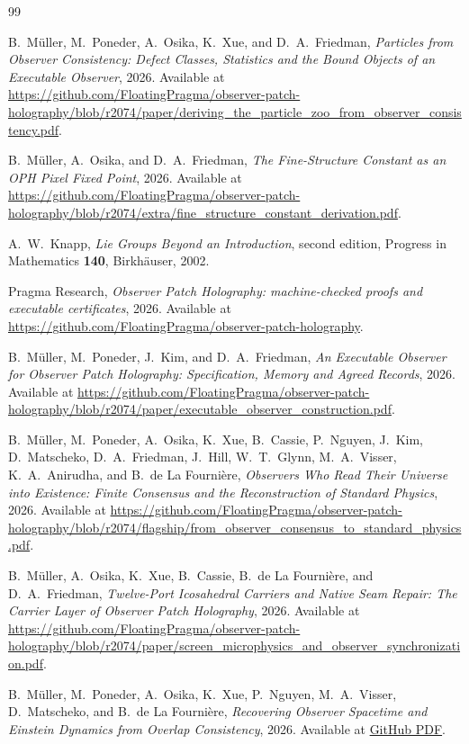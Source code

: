 \documentclass[11pt]{article}
\begin{document}
\begin{thebibliography}{99}

B.~M\"uller, M.~Poneder, A.~Osika, K.~Xue, and D.~A.~Friedman,
\emph{Particles from Observer Consistency: Defect Classes, Statistics and the Bound Objects of an Executable Observer},
2026.
Available at \url{https://github.com/FloatingPragma/observer-patch-holography/blob/r2074/paper/deriving_the_particle_zoo_from_observer_consistency.pdf}.

B.~M\"uller, A.~Osika, and D.~A.~Friedman,
\emph{The Fine-Structure Constant as an OPH Pixel Fixed Point},
2026.
Available at \url{https://github.com/FloatingPragma/observer-patch-holography/blob/r2074/extra/fine_structure_constant_derivation.pdf}.

A.~W.~Knapp,
\emph{Lie Groups Beyond an Introduction},
second edition, Progress in Mathematics \textbf{140},
Birkh\"auser, 2002.

Pragma Research,
\emph{Observer Patch Holography: machine-checked proofs and executable certificates},
2026.
Available at \url{https://github.com/FloatingPragma/observer-patch-holography}.

B.~M\"uller, M.~Poneder, J.~Kim, and D.~A.~Friedman,
\emph{An Executable Observer for Observer Patch Holography: Specification, Memory and Agreed Records},
2026.
Available at \url{https://github.com/FloatingPragma/observer-patch-holography/blob/r2074/paper/executable_observer_construction.pdf}.

B.~M\"uller, M.~Poneder, A.~Osika, K.~Xue, B.~Cassie, P.~Nguyen, J.~Kim, D.~Matscheko, D.~A.~Friedman, J.~Hill, W.~T.~Glynn, M.~A.~Visser, K.~A.~Anirudha, and B.~de La Fourni\`ere,
\emph{Observers Who Read Their Universe into Existence: Finite Consensus and the Reconstruction of Standard Physics},
2026.
Available at \url{https://github.com/FloatingPragma/observer-patch-holography/blob/r2074/flagship/from_observer_consensus_to_standard_physics.pdf}.

B.~M\"uller, A.~Osika, K.~Xue, B.~Cassie, B.~de La Fourni\`ere, and D.~A.~Friedman,
\emph{Twelve-Port Icosahedral Carriers and Native Seam Repair: The Carrier Layer of Observer Patch Holography},
2026.
Available at \url{https://github.com/FloatingPragma/observer-patch-holography/blob/r2074/paper/screen_microphysics_and_observer_synchronization.pdf}.

B.~M\"uller, M.~Poneder, A.~Osika, K.~Xue, P.~Nguyen, M.~A.~Visser, D.~Matscheko, and B.~de La Fourni\`ere,
\emph{Recovering Observer Spacetime and Einstein Dynamics from Overlap Consistency},
2026.
Available at \href{https://github.com/FloatingPragma/observer-patch-holography/blob/r2074/paper/recovering_observer_spacetime_and_einstein_dynamics_from_overlap_consistency.pdf}{GitHub PDF}.


\end{thebibliography}
\end{document}
